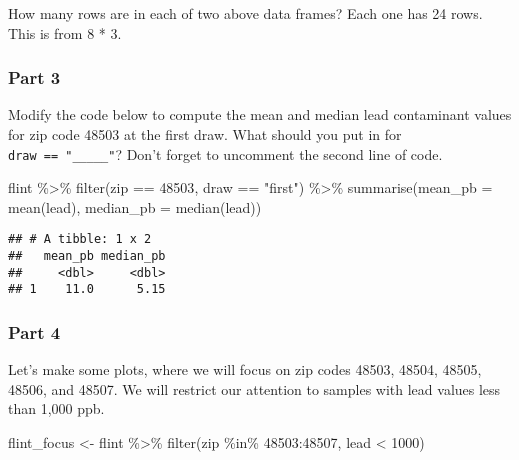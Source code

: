 \documentclass[
]{article}
\newenvironment{Shaded}{\begin{snugshade}}{\end{snugshade}}
\newcommand{\AttributeTok}[1]{\textcolor[rgb]{0.77,0.63,0.00}{#1}}
\newcommand{\DecValTok}[1]{\textcolor[rgb]{0.00,0.00,0.81}{#1}}
\newcommand{\FunctionTok}[1]{\textcolor[rgb]{0.00,0.00,0.00}{#1}}
\newcommand{\NormalTok}[1]{#1}
\newcommand{\OtherTok}[1]{\textcolor[rgb]{0.56,0.35,0.01}{#1}}
\newcommand{\SpecialCharTok}[1]{\textcolor[rgb]{0.00,0.00,0.00}{#1}}
\newcommand{\StringTok}[1]{\textcolor[rgb]{0.31,0.60,0.02}{#1}}
\begin{document}
How many rows are in each of two above data frames? Each one has 24
rows. This is from 8 * 3.

\hypertarget{part-3}{%
\subsubsection{Part 3}\label{part-3}}

Modify the code below to compute the mean and median lead contaminant
values for zip code 48503 at the first draw. What should you put in for
\texttt{draw\ ==\ "\_\_\_\_\_"}? Don't forget to uncomment the second
line of code.

\begin{Shaded}
\begin{Highlighting}[]
\NormalTok{flint }\SpecialCharTok{\%\textgreater{}\%} 
  \FunctionTok{filter}\NormalTok{(zip }\SpecialCharTok{==} \DecValTok{48503}\NormalTok{, draw }\SpecialCharTok{==} \StringTok{"first"}\NormalTok{) }\SpecialCharTok{\%\textgreater{}\%} 
  \FunctionTok{summarise}\NormalTok{(}\AttributeTok{mean\_pb =} \FunctionTok{mean}\NormalTok{(lead),}
            \AttributeTok{median\_pb =} \FunctionTok{median}\NormalTok{(lead))}
\end{Highlighting}
\end{Shaded}

\begin{verbatim}
## # A tibble: 1 x 2
##   mean_pb median_pb
##     <dbl>     <dbl>
## 1    11.0      5.15
\end{verbatim}

\hypertarget{part-4}{%
\subsubsection{Part 4}\label{part-4}}

Let's make some plots, where we will focus on zip codes 48503, 48504,
48505, 48506, and 48507. We will restrict our attention to samples with
lead values less than 1,000 ppb.

\begin{Shaded}
\begin{Highlighting}[]
\NormalTok{flint\_focus }\OtherTok{\textless{}{-}}\NormalTok{ flint }\SpecialCharTok{\%\textgreater{}\%} 
  \FunctionTok{filter}\NormalTok{(zip }\SpecialCharTok{\%in\%} \DecValTok{48503}\SpecialCharTok{:}\DecValTok{48507}\NormalTok{, lead }\SpecialCharTok{\textless{}} \DecValTok{1000}\NormalTok{)}
\end{Highlighting}
\end{Shaded}
\end{document}
